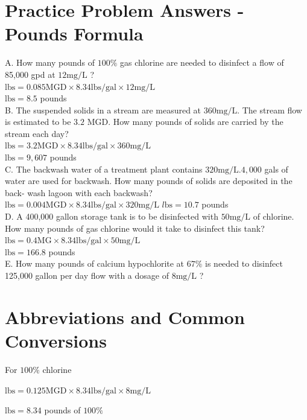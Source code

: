 \documentclass[10pt]{article}
\begin{document}
\section{Practice Problem Answers - Pounds Formula}
A. How many pounds of $100 \%$ gas chlorine are needed to disinfect a flow of 85,000 gpd at $12 \mathrm{mg} / \mathrm{L}$ ?\\
$\mathrm{lbs}=0.085 \mathrm{MGD} \times 8.34 \mathrm{lbs} / \mathrm{gal} \times 12 \mathrm{mg} / \mathrm{L}$\\
$\mathrm{lbs}=8.5$ pounds\\
B. The suspended solids in a stream are measured at $360 \mathrm{mg} / \mathrm{L}$. The stream flow is estimated to be $3.2$ MGD. How many pounds of solids are carried by the stream each day?\\
$\mathrm{lbs}=3.2 \mathrm{MGD} \times 8.34 \mathrm{lbs} / \mathrm{gal} \times 360 \mathrm{mg} / \mathrm{L}$\\
$\mathrm{lbs}=9,607$ pounds\\
C. The backwash water of a treatment plant contains $320 \mathrm{mg} / \mathrm{L} .4,000$ gals of water are used for backwash. How many pounds of solids are deposited in the back- wash lagoon with each backwash?\\
$\mathrm{lbs}=0.004 \mathrm{MGD} \times 8.34 \mathrm{lbs} / \mathrm{gal} \times 320 \mathrm{mg} / \mathrm{L}$ $l \mathrm{bs}=10.7$ pounds\\
D. A 400,000 gallon storage tank is to be disinfected with $50 \mathrm{mg} / \mathrm{L}$ of chlorine. How many pounds of gas chlorine would it take to disinfect this tank?\\
$\mathrm{lbs}=0.4 \mathrm{MG} \times 8.34 \mathrm{lbs} / \mathrm{gal} \times 50 \mathrm{mg} / \mathrm{L}$\\
$\mathrm{lbs}=166.8$ pounds\\
E. How many pounds of calcium hypochlorite at $67 \%$ is needed to disinfect 125,000 gallon per day flow with a dosage of $8 \mathrm{mg} / \mathrm{L}$ ?

\section{Abbreviations and Common Conversions}
For $100 \%$ chlorine

$\mathrm{lbs}=0.125 \mathrm{MGD} \times 8.34 \mathrm{lbs} / \mathrm{gal} \times 8 \mathrm{mg} / \mathrm{L}$

$\mathrm{lbs}=8.34$ pounds of $100 \%$
\end{document}
